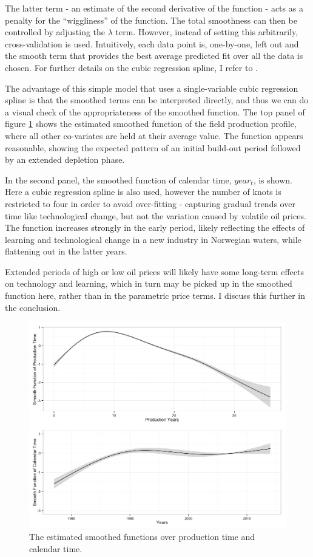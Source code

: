 \documentclass[11pt]{article}
\begin{document}
The latter term - an estimate of the second derivative of the function - acts as a penalty for the ``wiggliness'' of the function. The total smoothness can then be controlled by adjusting the $\lambda$ term. However, instead of setting this arbitrarily, cross-validation is used. Intuitively, each data point is, one-by-one, left out and the smooth term that provides the best average predicted fit over all the data is chosen.  For further details on the cubic regression spline, I refer to \citet{wood_generalized_2006}.

The advantage of this simple model that uses a single-variable cubic regression spline is that the smoothed terms can be interpreted directly, and thus we can do a visual check of the appropriateness of the smoothed function. The top panel of figure \ref{smooths} shows the estimated smoothed function of the field production profile, where all other co-variates are held at their average value.  The function appears reasonable, showing the expected pattern of an initial build-out period followed by an extended depletion phase. 

In the second panel, the smoothed function of calendar time, $year_t$, is shown. Here a cubic regression spline is also used, however the number of knots is restricted to four in order to avoid over-fitting - capturing gradual trends over time like technological change, but not the variation caused by volatile oil prices. The function increases strongly in the early period, likely reflecting the effects of learning and technological change in a new industry in Norwegian waters, while flattening out in the latter years. 

Extended periods of high or low oil prices will likely have some long-term effects on technology and learning, which in turn may be picked up in the smoothed function here, rather than in the parametric price terms.  I discuss this further in the conclusion.  

\begin{figure}
	\includegraphics[width=1\textwidth]{figures/smooths.png}
	\caption{The estimated smoothed functions over production time and calendar time.}
	\label{smooths}
\end{figure}
\end{document}
